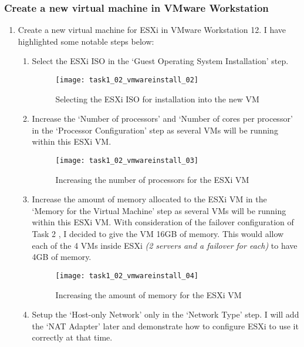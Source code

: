 \subsubsection*{Create a new virtual machine in VMware Workstation}
\begin{enumerate}[resume*=task1methodology]
  \item Create a new virtual machine for ESXi in VMware Workstation 12. I have highlighted some notable steps below:
    \begin{enumerate}[label=(\alph*)]
      \item Select the ESXi ISO in the `Guest Operating System Installation' step.
        \begin{figure}[H]
          \centering
          \captionsetup{skip=2pt}
          \texttt{[image: task1\_02\_vmwareinstall\_02]}
          \caption{Selecting the ESXi ISO for installation into the new VM}
          \label{fig:task1:02_vmwarewiz_02}
        \end{figure}
      \item Increase the `Number of processors' and `Number of cores per processor' in the `Processor Configuration' step as several VMs will be running within this ESXi VM.
        \begin{figure}[H]
          \centering
          \captionsetup{skip=2pt}
          \texttt{[image: task1\_02\_vmwareinstall\_03]}
          \caption{Increasing the number of processors for the ESXi VM}
          \label{fig:task1:02_vmwarewiz_03}
        \end{figure}
      \item Increase the amount of memory allocated to the ESXi VM in the `Memory for the Virtual Machine' step as several VMs will be running within this ESXi VM. With consideration of the failover configuration of Task 2 , I decided to give the VM 16GB of memory. This would allow each of the 4 VMs inside ESXi \textit{(2 servers and a failover for each)} to have 4GB of memory.
        \begin{figure}[H]
          \centering
          \captionsetup{skip=2pt}
          \texttt{[image: task1\_02\_vmwareinstall\_04]}
          \caption{Increasing the amount of memory for the ESXi VM}
          \label{fig:task1:02_vmwarewiz_04}
        \end{figure}
      \item Setup the `Host-only Network' only in the `Network Type' step. I will add the `NAT Adapter' later and demonstrate how to configure ESXi to use it correctly at that time.

\end{enumerate}
\end{enumerate}
